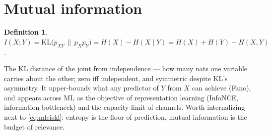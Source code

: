 \documentclass[11pt]{article}
\newtheorem{definition}{Definition}
\begin{document}
\section{Mutual information}

\begin{definition}
$I(X;Y) = \mathrm{KL}\bigl(p_{XY} \,\|\, p_X p_Y\bigr)
= H(X) - H(X\mid Y) = H(X)+H(Y)-H(X,Y)$.
\end{definition}

The KL distance of the joint from independence --- how many nats one
variable carries about the other; zero iff independent, and symmetric
despite KL's asymmetry. It upper-bounds what any predictor of $Y$ from
$X$ can achieve (Fano), and appears across ML as the objective of
representation learning (InfoNCE, information bottleneck) and the
capacity limit of channels. Worth internalizing next to
\eqref{eq:mleiskl}: entropy is the floor of prediction, mutual
information is the budget of relevance.
\end{document}
